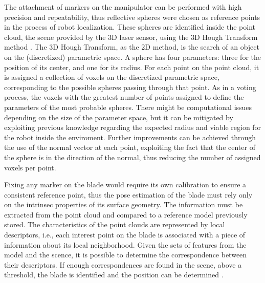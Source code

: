 The attachment of markers on the manipulator can be performed with high
precision and repeatability, thus reflective spheres were chosen as reference
points in the process of robot localization. These spheres are identified inside
the point cloud, the scene provided by the 3D laser sensor, using the 3D Hough
Transform method \cite{camurri20143d}. The 3D Hough Transform, as the 2D method,
is the search of an object on the (discretized) parametric space. A sphere has
four parameters: three for the position of its center, and one for its radius.
For each point on the point cloud, it is assigned a collection of voxels on the
discretized parametric space, corresponding to the possible spheres passing
through that point. As in a voting process, the voxels with the greatest number
of points assigned to define the parameters of the most probable spheres. There
might be computational issues depending on the size of the parameter space, but
it can be mitigated by exploiting previous knowledge regarding the expected
radius and viable region for the robot inside the enviroment. Further
improvements can be achieved through the use of the normal vector at each point,
exploiting the fact that the center of the sphere is in the direction of the
normal, thus reducing the number of assigned voxels per point.

Fixing any marker on the blade would require its own calibration to ensure a
consistent reference point, thus the pose estimation of the blade must rely only
on the intrinsec properties of its surface geometry. The information must be
extracted from the point cloud and compared to a reference model previously
stored. The characteristics of the point clouds are represented by local
descriptors, i.e., each interest point on the blade is associated with a piece
of information about its local neighborhood. Given the sets of features from the
model and the scence,  it is possible to determine the correspondence between
their descriptors. If enough correspondences are found in the scene, above a
threshold, the blade is identified and the position can be determined
\cite{Tombari2010a}.

